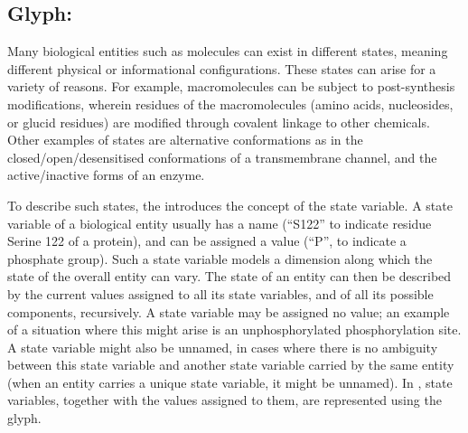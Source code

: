 \subsection{Glyph: }
\label{sec:stateVariable}

Many biological entities such as molecules can exist in different states, meaning different physical or informational configurations.
These states can arise for a variety of reasons.
For example, macromolecules can be subject to post-synthesis modifications, wherein residues of the macromolecules (amino acids, nucleosides, or glucid residues) are modified through covalent linkage to other chemicals.
Other examples of states are alternative conformations as in the closed/open/desensitised conformations of a transmembrane channel, and the active/inactive forms of an enzyme.

To describe such states, the \PD introduces the concept of the state variable.
A state variable of a biological entity usually has a name (\eg ``S122'' to indicate residue Serine 122 of a protein), and can be assigned a value (\eg ``P'', to indicate a phosphate group).
Such a state variable models a dimension along which the state of the overall entity can vary.
The state of an entity can then be described by the current values assigned to all its state variables, and of all its possible components, recursively.
A state variable may be assigned no value; an example of a situation where this might arise is an unphosphorylated phosphorylation site.
A state variable might also be unnamed, in cases where there is no ambiguity between this state variable and another state variable carried by the same entity (\eg when an entity carries a unique state variable, it might be unnamed).
In \PD, state variables, together with the values assigned to them, are represented using the  glyph.

